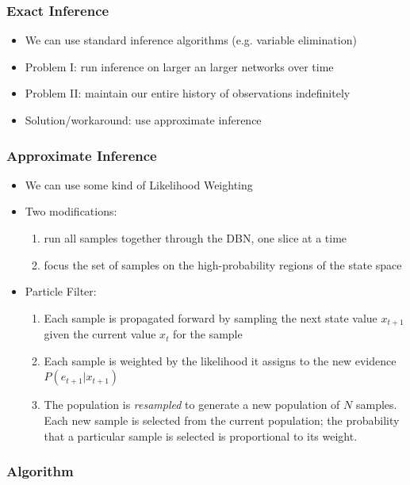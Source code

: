 \begin{frame}
\frametitle{Exact Inference}
\begin{itemize}
\item We can use standard inference algorithms (e.g. variable elimination)
\item Problem I: run inference on larger an larger networks over time
\item Problem II: maintain our entire history of observations indefinitely
\item Solution/workaround: use approximate inference
\end{itemize}
\end{frame}

\begin{frame}
\frametitle{Approximate Inference}
\begin{itemize}
\item We can use some kind of Likelihood Weighting
\item Two modifications:
\begin{enumerate}
\item run all samples together through the DBN, one slice at a time
\item focus the set of samples on the high-probability regions of the state space
\end{enumerate}
\item Particle Filter:
\begin{enumerate}
\item Each sample is propagated forward by sampling the next state value $x_{t+1}$ given the current value $x_t$ for the sample
\item Each sample is weighted by the likelihood it assigns to the new evidence $P(e_{t+1}|x_{t+1})$
\item The population is \textit{resampled} to generate a new population of $N$ samples. Each new sample is selected from the current population; the probability that a particular sample is selected is proportional to its weight.
\end{enumerate}
\end{itemize}
\end{frame}

\begin{frame}
\frametitle{Algorithm}
\end{frame}